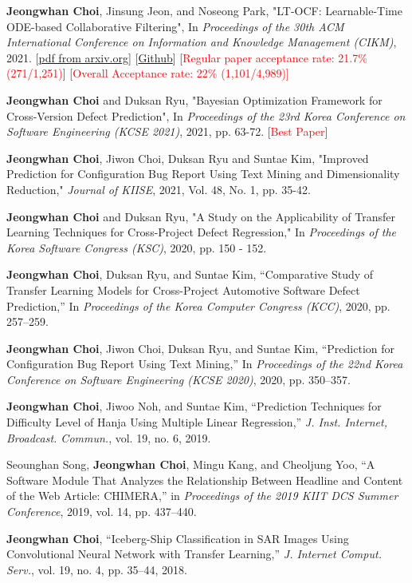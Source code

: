 \documentclass[10pt]{article}
\newenvironment{changemargin}[2]{
  \begin{list}{}{
    \setlength{\topsep}{0pt}
    \setlength{\leftmargin}{#1}
    \setlength{\rightmargin}{#2}
    \setlength{\listparindent}{\parindent}
    \setlength{\itemindent}{\parindent}
    \setlength{\parsep}{\parskip}
  }
  \item[]}{\end{list}
}
\newcommand{\presentation}[2]{
	{#1} \hfill \emph{#2}\\ \bigskip
}
\newcommand{\RED}[1]{\textcolor{red}{#1}}
\newenvironment{body} {
	\vspace*{-16pt}
	\begin{changemargin}{-0.25in}{-0.5in}
  }
	{\end{changemargin}
}
\begin{document}
\begin{body}
\presentation{\textbf{Jeongwhan Choi}, Jinsung Jeon, and Noseong Park,  "LT-OCF: Learnable-Time ODE-based Collaborative Filtering", In \emph{Proceedings of the 30th ACM International Conference on Information and Knowledge Management (CIKM)}, 2021. [\href{https://arxiv.org/pdf/2108.06208.pdf}{pdf from arxiv.org}] [\href{https://github.com/jeongwhanchoi/LT-OCF}{Github}]  [\RED{Regular paper acceptance rate: 21.7\% (271/1,251)}]  [\RED{Overall Acceptance rate: 22\% (1,101/4,989)]} }{}
\presentation{\textbf{Jeongwhan Choi} and Duksan Ryu, "Bayesian Optimization Framework for Cross-Version Defect Prediction", In \emph{Proceedings of the 23rd Korea Conference on Software Engineering (KCSE 2021)}, 2021, pp. 63-72.  [\RED{Best Paper}]}{}
\presentation{\textbf{Jeongwhan Choi}, Jiwon Choi, Duksan Ryu and Suntae Kim, "Improved Prediction for Configuration Bug Report Using Text Mining and Dimensionality Reduction," \emph{Journal of KIISE}, 2021, Vol. 48, No. 1, pp. 35-42.}{}
\presentation{\textbf{Jeongwhan Choi} and Duksan Ryu, "A Study on the Applicability of Transfer Learning Techniques for Cross-Project Defect Regression," In \emph{Proceedings of the Korea Software Congress (KSC)}, 2020, pp. 150 - 152.}{}
\presentation{\textbf{Jeongwhan Choi}, Duksan Ryu, and Suntae Kim, “Comparative Study of Transfer Learning Models for Cross-Project Automotive Software Defect Prediction,” In \emph{Proceedings of the Korea Computer Congress (KCC)}, 2020, pp. 257–259.}{}
\presentation{\textbf{Jeongwhan Choi}, Jiwon Choi, Duksan Ryu, and Suntae Kim, “Prediction for Configuration Bug Report Using Text Mining,” In \emph{Proceedings of the 22nd Korea Conference on Software Engineering (KCSE 2020)}, 2020, pp. 350–357.}{}
\presentation{\textbf{Jeongwhan Choi}, Jiwoo Noh, and Suntae Kim, “Prediction Techniques for Difficulty Level of Hanja Using Multiple Linear Regression,” \emph{J. Inst. Internet, Broadcast. Commun.}, vol. 19, no. 6, 2019.}{}
\presentation{Seounghan Song, \textbf{Jeongwhan Choi}, Mingu Kang, and Cheoljung Yoo, “A Software Module That Analyzes the Relationship Between Headline and Content of the Web Article: CHIMERA,” in \emph{Proceedings of the 2019 KIIT DCS Summer Conference}, 2019, vol. 14, pp. 437–440.}{}
\presentation{\textbf{Jeongwhan Choi}, “Iceberg-Ship Classification in SAR Images Using Convolutional Neural Network with Transfer Learning,” \emph{J. Internet Comput. Serv.}, vol. 19, no. 4, pp. 35–44, 2018.}{}


\end{body}

\medskip
\end{document}
